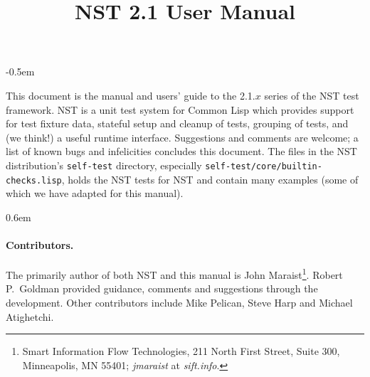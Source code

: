 \documentclass{article}
\title{NST 2.1 User Manual}
\begin{document}
\maketitle
\thispagestyle{empty}
\parskip -0.5em

\noindent This document is the manual and users' guide to the 2.1.$x$
series of the NST test framework.  NST is a unit test system for
Common Lisp which provides support for test fixture data, stateful
setup and cleanup of tests, grouping of tests, and (we think!) a
useful runtime interface.  Suggestions and comments are welcome; a
list of known bugs and infelicities concludes this document.  The
files in the NST distribution's \texttt{self-test} directory,
especially \texttt{self-test/core/builtin-checks.lisp}, holds the NST
tests for NST and contain many examples (some of which we have adapted
for this manual).

\tableofcontents
\parskip 0.6em
\parindent 0pt

\paragraph{Contributors.}
The primarily author of both NST and this manual is John
Maraist\footnote{Smart Information Flow Technologies, 211 North First
  Street, Suite 300, Minneapolis, MN 55401; \textsl{jmaraist} at
  \textsl{sift.info}.}.  Robert P.\ Goldman provided guidance,
comments and suggestions through the development.  Other contributors
include Mike Pelican, Steve Harp and Michael Atighetchi.
\cleardoublepage {}








\appendix
{}



\printindex
\end{document}
